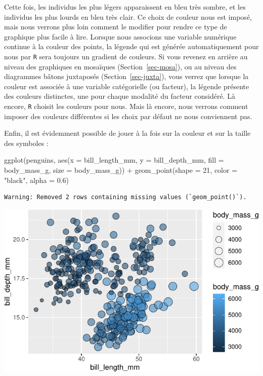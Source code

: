 \documentclass[
  a4paper,
  DIV=11,
  numbers=noendperiod,
  oneside]{scrreprt}
\newenvironment{Shaded}{}{}
\newcommand{\AttributeTok}[1]{\textcolor[rgb]{0.84,0.23,0.29}{#1}}
\newcommand{\DecValTok}[1]{\textcolor[rgb]{0.00,0.36,0.77}{#1}}
\newcommand{\FloatTok}[1]{\textcolor[rgb]{0.00,0.36,0.77}{#1}}
\newcommand{\FunctionTok}[1]{\textcolor[rgb]{0.44,0.26,0.76}{#1}}
\newcommand{\NormalTok}[1]{\textcolor[rgb]{0.14,0.16,0.18}{#1}}
\newcommand{\SpecialCharTok}[1]{\textcolor[rgb]{0.00,0.36,0.77}{#1}}
\newcommand{\StringTok}[1]{\textcolor[rgb]{0.01,0.18,0.38}{#1}}
\begin{document}
Cette fois, les individus les plus légers apparaissent en bleu très
sombre, et les individus les plus lourds en bleu très clair. Ce choix de
couleur nous est imposé, mais nous verrons plus loin comment le modifier
pour rendre ce type de graphique plus facile à lire. Lorsque nous
associons une variable numérique continue à la couleur des points, la
légende qui est générée automatiquement pour nous par \texttt{R} sera
toujours un gradient de couleurs. Si vous revenez en arrière au niveau
des graphiques en mosaïques (Section~\ref{sec-mosa}), ou au niveau des
diagrammes bâtons juxtaposés (Section~\ref{sec-juxta}), vous verrez que
lorsque la couleur est associée à une variable catégorielle (ou
facteur), la légende présente des couleurs distinctes, une pour chaque
modalité du facteur considéré. Là encore, \texttt{R} choisit les
couleurs pour nous. Mais là encore, nous verrons comment imposer des
couleurs différentes si les choix par défaut ne nous conviennent pas.

Enfin, il est évidemment possible de jouer à la fois sur la couleur et
sur la taille des symboles :

\begin{Shaded}
\begin{Highlighting}[]
\FunctionTok{ggplot}\NormalTok{(penguins, }\FunctionTok{aes}\NormalTok{(}\AttributeTok{x =}\NormalTok{ bill\_length\_mm, }\AttributeTok{y =}\NormalTok{ bill\_depth\_mm,}
                     \AttributeTok{fill =}\NormalTok{ body\_mass\_g, }\AttributeTok{size =}\NormalTok{ body\_mass\_g)) }\SpecialCharTok{+}
  \FunctionTok{geom\_point}\NormalTok{(}\AttributeTok{shape =} \DecValTok{21}\NormalTok{, }\AttributeTok{color =} \StringTok{"black"}\NormalTok{, }\AttributeTok{alpha =} \FloatTok{0.6}\NormalTok{)}
\end{Highlighting}
\end{Shaded}

\begin{verbatim}
Warning: Removed 2 rows containing missing values (`geom_point()`).
\end{verbatim}

\includegraphics{03-visualization_files/figure-pdf/unnamed-chunk-77-1.pdf}
\end{document}
